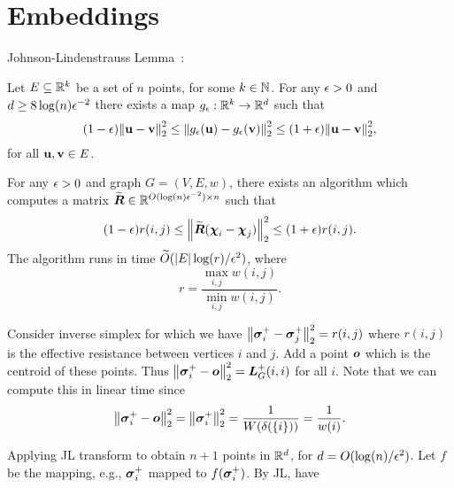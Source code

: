 \section{Embeddings}
Johnson-Lindenstrauss Lemma~\cite{johnson1984extensions,dasgupta2003elementary}: 

\begin{theorem}
Let $E\subseteq \mathbb{R}^k$ be a set of $n$ points, for some $k\in\mathbb{N}$. For any $\epsilon>0$ and $d\geq 8\log(n)\epsilon^{-2}$ there exists a map $g_\epsilon:\mathbb{R}^k\to\mathbb{R}^d$ such that 
\begin{equation*}
    (1-\epsilon)\norm{\vb{u}-\vb{v}}_2^2 \leq \norm{g_\epsilon(\vb{u}) - g_\epsilon(\vb{v})}_2^2 \leq (1+\epsilon)\norm{\vb{u}-\vb{v}}_2^2,
\end{equation*}
for all $\vb{u},\vb{v}\in E$. 
\end{theorem}

\begin{theorem}
For any $\epsilon>0$ and graph $G=(V,E,w)$, there exists an algorithm which computes a matrix $\widetilde{\vb*{R}}\in\mathbb{R}^{O(\log(n)\epsilon^{-2})\times n}$ such that 
\begin{equation*}
    (1-\epsilon)r(i,j) \leq \norm{\widetilde{\vb*{R}}(\boldsymbol{\chi}_i-\boldsymbol{\chi}_j)}_2^2 \leq (1+\epsilon) r(i,j).
\end{equation*}
The algorithm runs in time $\widetilde{O}( |E|\log (r)/\epsilon^2)$, where 
\[r=\frac{\max_{i,j}w(i,j)}{\min_{i,j}w(i,j)}.\]
\end{theorem}

Consider inverse simplex for which we have $\norm{\vb*{\sigma}_i^+-\vb*{\sigma}_j^+}_2^2=r(i,j)$ where $r(i,j)$ is the effective resistance between vertices $i$ and $j$. Add a point $\vb*{o}$ which is the centroid of these points. Thus $\norm{\vb*{\sigma}_i^+-\vb*{o}}_2^2 = \vb*{L}_G^+(i,i)$ for all $i$. Note that we can compute this in linear time since 
\[\norm{\vb*{\sigma}_i^+-\vb*{o}}_2^2 = \norm{\vb*{\sigma}_i^+}_2^2 = \frac{1}{W(\delta(\{i\}))}=\frac{1}{w(i)}.\]

Applying JL transform to obtain $n+1$ points in $\mathbb{R}^d$, for $d=O(\log(n)/\epsilon^2)$. Let $f$ be the mapping, e.g., $\vb*{\sigma}_i^+$ mapped to $f(\vb*{\sigma}_i^+)$. By JL, have 

